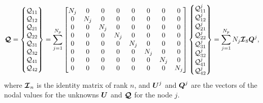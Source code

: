 \documentclass[a4paper,10pt]{article}
\newcommand{\bm}[1]{\text{\boldmath$#1$\unboldmath}}
\newcommand{\DiscFunc}[1]{\bm{#1}}
\newcommand{\SecOrdTens}[1]{\bm{\mathcal{#1}}}
\renewcommand{\u}{\DiscFunc{U}}
\newcommand{\G}{\SecOrdTens{Q}}
\newcommand{\I}{\SecOrdTens{I}}
\begin{document}
\[
 \G = \begin{Bmatrix}
               \mathcal{Q}_{11}\\
               \mathcal{Q}_{12}\\
               \mathcal{Q}_{21}\\
               \mathcal{Q}_{22}\\               
               \mathcal{Q}_{31}\\
               \mathcal{Q}_{32}\\
               \mathcal{Q}_{41}\\
               \mathcal{Q}_{42}
              \end{Bmatrix}=
\sum_{j=1}^{N_p} \begin{bmatrix}
                  N_j   &       0      &       0     &       0       &       0      &       0     &       0      &       0 \\ 
                  0     &      N_j     &       0     &       0       &       0      &       0     &       0      &       0 \\ 
                  0     &       0      &      N_j    &       0       &       0      &       0     &       0      &       0 \\ 
                  0     &       0      &       0     &       N_j     &       0      &       0     &       0      &       0 \\ 
                  0     &       0      &       0     &       0       &      N_j     &       0     &       0      &       0 \\ 
                  0     &       0      &       0     &       0       &       0      &      N_j    &       0      &       0 \\ 
                  0     &       0      &       0     &       0       &       0      &       0     &      N_j     &       0 \\ 
                  0     &       0      &       0     &       0       &       0      &       0     &       0      &      N_j
                 \end{bmatrix}
                 \begin{Bmatrix}
               \mathcal{Q}_{11}^j\\
               \mathcal{Q}_{12}^j\\
               \mathcal{Q}_{21}^j\\
               \mathcal{Q}_{22}^j\\               
               \mathcal{Q}_{31}^j\\
               \mathcal{Q}_{32}^j\\
               \mathcal{Q}_{41}^j\\
               \mathcal{Q}_{42}^j
                 \end{Bmatrix}= 
\sum_{j=1}^{N_p} N_j \I_8 \bm{Q}^j,
\]
where $\I_n$ is the identity matrix of rank $n$, and $\u^j$ and $\bm{Q}^j$ are the vectors of the nodal values for the unknowns $\u$ and $\G$ for the node $j$.  
\end{document}
